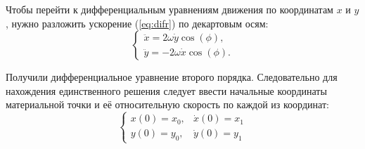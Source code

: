 Чтобы перейти к дифференциальным уравнениям движения по координатам $x$ и $y$, нужно разложить ускорение (\ref{eq:difr}) по декартовым осям:
\begin{equation}
	\begin{cases}
		\ddot{x} = 2\omega \dot{y} \cos(\phi),\\
		\ddot{y} = - 2\omega \dot{x}\cos(\phi).
	\end{cases}
\end{equation}
 
 Получили дифференциальное уравнение второго порядка. Следовательно для нахождения единственного решения следует ввести начальные координаты материальной точки и её относительную скорость по каждой из координат:
 \[
 	\begin{cases}
 		x(0) = x_{0}, & \dot{x}(0) = x_{1} \\
 		y(0) = y_{0}, & \dot{y}(0) = y_{1}
 	\end{cases}
 \]
